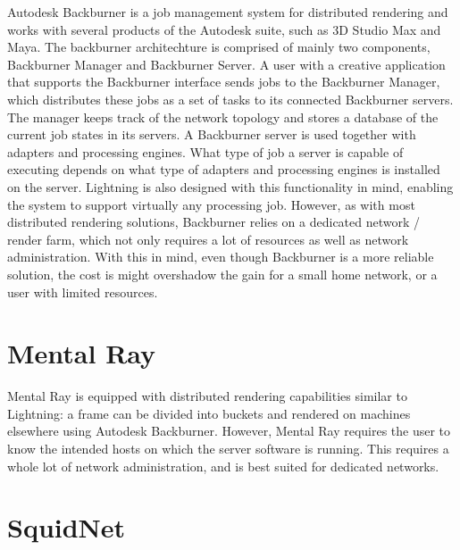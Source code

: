 Autodesk Backburner is a job management system for distributed rendering and works with several products of the Autodesk suite, such as 3D Studio Max and Maya. The backburner architechture is comprised of mainly two components, Backburner Manager and Backburner Server. A user with a creative application that supports the Backburner interface sends jobs to the Backburner Manager, which distributes these jobs as a set of tasks to its connected Backburner servers. The manager keeps track of the network topology and stores a database of the current job states in its servers. A Backburner server is used together with adapters and processing engines. What type of job a server is capable of executing depends on what type of adapters and processing engines is installed on the server. Lightning is also designed with this functionality in mind, enabling the system to support virtually any processing job. However, as with most distributed rendering solutions, Backburner relies on a dedicated network / render farm, which not only requires a lot of resources as well as network administration. With this in mind, even though Backburner is a more reliable solution, the cost is might overshadow the gain for a small home network, or a user with limited resources. 

\section{Mental Ray}


Mental Ray is equipped with distributed rendering capabilities similar to Lightning: a frame can be divided into buckets and rendered on machines elsewhere using Autodesk Backburner. However, Mental Ray requires the user to know the intended hosts on which the server software is running. This requires a whole lot of network administration, and is best suited for dedicated networks. 

\section{SquidNet}


